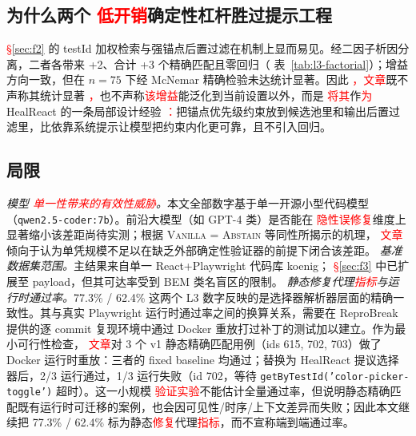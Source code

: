 \documentclass[UTF8, a4paper, 10.5pt, twocolumn, fontset=none]{ctexart}
\providecommand{\DIFaddbegin}{} %
\providecommand{\DIFaddend}{} %
\providecommand{\DIFaddtex}[1]{\textcolor{red}{#1}} %
\providecommand{\DIFadd}[1]{\texorpdfstring{\DIFaddtex{#1}}{#1}} %
\providecommand{\DIFaddincludegraphics}[2][]{{\color{blue}\fbox{\DIFOincludegraphics[#1]{#2}}}} %
\DeclareRobustCommand{\DIFaddbegin}{\DIFOaddbegin \let\includegraphics\DIFaddincludegraphics} %
\DeclareRobustCommand{\DIFaddend}{\DIFOaddend \let\includegraphics\DIFOincludegraphics} %
\begin{document}
\subsection{为什么两个 \DIFaddbegin \DIFadd{低开销}\DIFaddend 确定性杠杆胜过提示工程}
 \DIFaddbegin \DIFadd{\S\ref{sec:f2} }\DIFaddend 的 testId 加权检索与强锚点后置过滤在机制上显而易见。经二因子析因分离，二者各带来 +2、合计 +3 个精确匹配且零回归（ 表~\ref{tab:l3-factorial}）；增益方向一致，但在 $n=75$ 下经 McNemar 精确检验未达统计显著。因此 \DIFaddbegin \DIFadd{，文章}\DIFaddend 既不声称其统计显著 \DIFaddbegin \DIFadd{，}\DIFaddend 也不声称\DIFaddbegin \DIFadd{该增益}\DIFaddend 能泛化到当前设置以外，而是 \DIFaddbegin \DIFadd{将其}\DIFaddend 作\DIFaddbegin \DIFadd{为 }\DIFaddend HealReact 的一条局部设计经验 \DIFaddbegin \DIFadd{：}\DIFaddend 把锚点优先级约束放到候选池里和输出后置过滤里，比依靠系统提示让模型把约束内化更可靠，且不引入回归。

\subsection{局限}
\textit{模型 \DIFaddbegin \DIFadd{单一性带来的有效性威胁}\DIFaddend 。}本文全部数字基于单一开源小型代码模型（\texttt{qwen2.5-coder:7b}）。前沿大模型（如 GPT-4 类）是否能在 \DIFaddbegin \DIFadd{隐性误修复}\DIFaddend 维度上显著缩小该差距尚待实测；根据 \textsc{Vanilla = Abstain} 等同性所揭示的机理， \DIFaddbegin \DIFadd{文章}\DIFaddend 倾向于认为单凭规模不足以在缺乏外部确定性验证器的前提下闭合该差距。
\textit{基准数据集范围。}主结果来自单一 React+Playwright 代码库 koenig； \DIFaddbegin \DIFadd{\S\ref{sec:f3} }\DIFaddend 中已扩展至 payload，但其可达率受到 BEM 类名盲区的限制。
\textit{静态修复代理\DIFaddbegin \DIFadd{指标}\DIFaddend 与运行时通过率。}77.3\% / 62.4\% 这两个 L3 数字反映的是选择器解析器层面的精确一致性。其与真实 Playwright 运行时通过率之间的换算关系，需要在 ReproBreak 提供的逐 commit 复现环境中通过 Docker 重放打过补丁的测试加以建立。作为最小可行性检查， \DIFaddbegin \DIFadd{文章}\DIFaddend 对 3 个 v1 静态精确匹配用例（ids 615, 702, 703）做了 Docker 运行时重放：三者的 fixed baseline 均通过；替换为 HealReact 提议选择器后，2/3 运行通过，1/3 运行失败（id 702，等待 \texttt{getByTestId('color-picker-toggle')} 超时）。这一小规模 \DIFaddbegin \DIFadd{验证实验}\DIFaddend 不能估计全量通过率，但说明静态精确匹配既有运行时可迁移的案例，也会因可见性/时序/上下文差异而失败；因此本文继续把 77.3\% / 62.4\% 标为静态\DIFaddbegin \DIFadd{修复}\DIFaddend 代理\DIFaddbegin \DIFadd{指标}\DIFaddend ，而不宣称端到端通过率。
\end{document}
